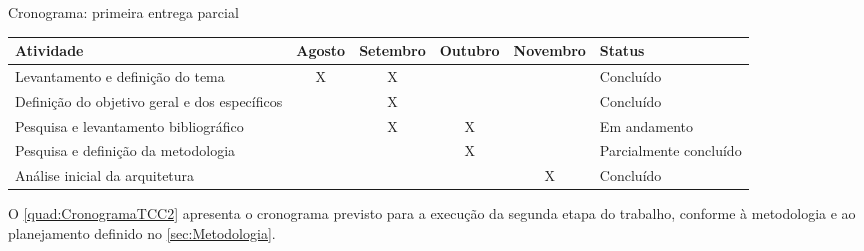 \begin{quadro}
    \caption{Cronograma: primeira entrega parcial\label{quad:CronogramaTCC1}}
    \begin{tabular}{ | m{4cm} | c | c | c | c | m{2.5cm} | }
    \hline
    \textbf{Atividade} &
        \textbf{Agosto} &
        \textbf{Setembro} &
        \textbf{Outubro} &
        \textbf{Novembro} &
        \textbf{Status} \\ \hline
    Levantamento e definição do tema &
        X &
        X &
        &
        &
        Concluído \\ \hline
    Definição do objetivo geral e dos específicos &
        &
        X &
        &
        &
        Concluído \\ \hline
    Pesquisa e levantamento bibliográfico &
        &
        X &
        X &
        &
        Em andamento \\ \hline
    Pesquisa e definição da metodologia &
        &
        &
        X &
        &
        Parcialmente concluído \\ \hline
    Análise inicial da arquitetura &
        &
        &
        &
        X &
        Concluído \\ \hline
    \end{tabular}
\end{quadro}

O \autoref{quad:CronogramaTCC2} apresenta o cronograma previsto para a execução
da segunda etapa do trabalho, conforme à metodologia e ao planejamento definido no
\autoref{sec:Metodologia}.

